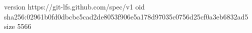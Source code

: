 version https://git-lfs.github.com/spec/v1
oid sha256:02961b0fd0dbcbc5cad2de8053f906e5a178d97035c0756d25cf0a3eb6832ad5
size 5566
